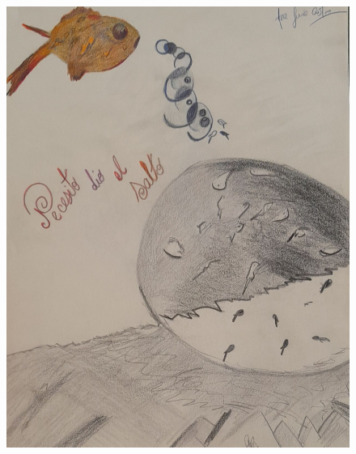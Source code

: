 \documentclass[12pt, a4paper, twoside]{book} %
\begin{document}
\begin{figure}[H]
	\centering
	\includegraphics[width=\textwidth]{1f81324df70a75.jpg}
\end{figure}

\clearpage
\end{document}
